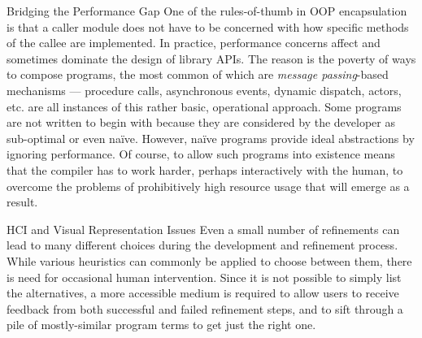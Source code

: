 \begin{subparagraph}{Bridging the Performance Gap}
One of the rules-of-thumb in OOP encapsulation is that a caller module
does not have to be concerned with how specific methods of the callee are
implemented. In practice, performance concerns affect and sometimes dominate
the design of library APIs.
The reason is the poverty of ways to compose programs, the most common of
which are \emph{message passing}-based mechanisms --- procedure calls,
asynchronous events, dynamic dispatch, actors, etc. are all instances of
this rather basic, operational approach.
Some programs are not written to begin with because they are considered
by the developer as sub-optimal or even na\"ive.
However, na\"ive programs provide ideal abstractions by ignoring performance.
Of course, to allow such programs into existence means that the compiler
has to work harder, perhaps interactively with the human, to overcome the
problems of prohibitively high resource usage that will emerge as a result.
\end{subparagraph}


\begin{subparagraph}{HCI and Visual Representation Issues}
Even a small number of refinements can lead to many different choices
during the development and refinement process.
While various heuristics can commonly be applied to choose between them,
there is need for occasional human intervention.
Since it is not possible to simply list the alternatives, a more accessible
medium is required to allow users to receive feedback from both successful
and failed refinement steps, and to sift through a pile of mostly-similar
program terms to get just the right one.
\end{subparagraph}
